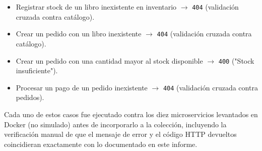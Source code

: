 \begin{itemize}
    \item Registrar stock de un libro inexistente en inventario $\rightarrow$
    \texttt{404} (validación cruzada contra catálogo).
    \item Crear un pedido con un libro inexistente $\rightarrow$ \texttt{404}
    (validación cruzada contra catálogo).
    \item Crear un pedido con una cantidad mayor al stock disponible
    $\rightarrow$ \texttt{400} ("Stock insuficiente").
    \item Procesar un pago de un pedido inexistente $\rightarrow$ \texttt{404}
    (validación cruzada contra pedidos).
\end{itemize}

Cada uno de estos casos fue ejecutado contra los diez microservicios levantados en
Docker (no simulado) antes de incorporarlo a la colección, incluyendo la verificación
manual de que el mensaje de error y el código HTTP devueltos coincidieran exactamente
con lo documentado en este informe.
